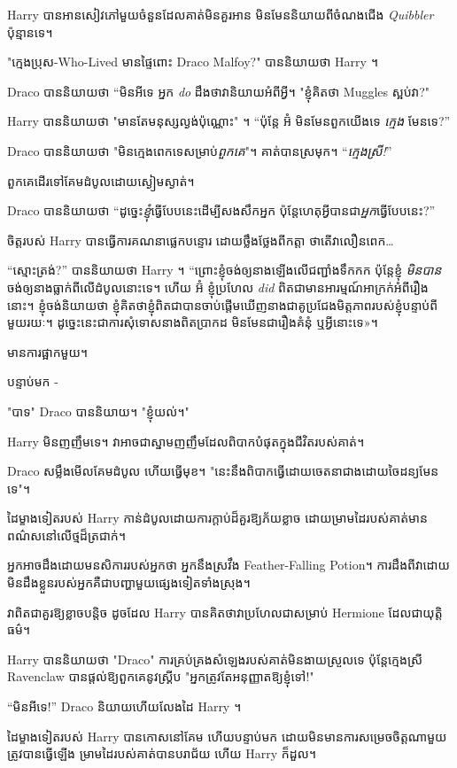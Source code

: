 Harry បានអានសៀវភៅមួយចំនួនដែលគាត់មិនគួរអាន មិនមែននិយាយពីចំណងជើង \emph{Quibbler} ប៉ុន្មានទេ។

"ក្មេងប្រុស-Who-Lived មានផ្ទៃពោះ Draco Malfoy?" បាននិយាយថា Harry ។

Draco បាននិយាយថា “មិនអីទេ អ្នក \emph{do} ដឹងថាវានិយាយអំពីអ្វី។ "ខ្ញុំគិតថា Muggles ស្អប់វា?"

Harry បាននិយាយថា "មានតែមនុស្សល្ងង់ប៉ុណ្ណោះ" ។ “ប៉ុន្តែ អ៊ំ មិនមែនពួកយើងទេ \emph{ក្មេង} មែនទេ?”

Draco បាននិយាយថា "មិនក្មេងពេកទេសម្រាប់\emph{ពួកគេ}"។ គាត់បានស្រមុក។ “\emph{ក្មេងស្រី!}”

ពួកគេដើរទៅគែមដំបូលដោយស្ងៀមស្ងាត់។

Draco បាននិយាយថា “ដូច្នេះ\emph{ខ្ញុំ}ធ្វើបែបនេះដើម្បីសងសឹកអ្នក ប៉ុន្តែហេតុអ្វីបានជា\emph{អ្នក}ធ្វើបែបនេះ?”

ចិត្តរបស់ Harry បានធ្វើការគណនាផ្លេកបន្ទោរ ដោយថ្លឹងថ្លែងពីកត្តា ថាតើវាលឿនពេក…

“ស្មោះត្រង់?” បាននិយាយថា Harry ។ “ព្រោះខ្ញុំចង់ឲ្យនាងឡើងលើជញ្ជាំងទឹកកក ប៉ុន្តែខ្ញុំ \emph{មិនបាន} ចង់ឲ្យនាងធ្លាក់ពីលើដំបូលនោះទេ។ ហើយ អ៊ំ ខ្ញុំប្រហែល \emph{did} ពិតជាមានអារម្មណ៍អាក្រក់អំពីរឿងនោះ។ ខ្ញុំចង់និយាយថា ខ្ញុំគិតថាខ្ញុំពិតជាបានចាប់ផ្តើមឃើញនាងជាគូប្រជែងមិត្តភាពរបស់ខ្ញុំបន្ទាប់ពីមួយរយៈ។ ដូច្នេះ​នេះ​ជា​ការ​សុំទោស​នាង​ពិត​ប្រាកដ មិន​មែន​ជា​រឿង​គំនុំ ឬ​អ្វី​នោះ​ទេ»។

មានការផ្អាកមួយ។

បន្ទាប់មក -

"បាទ" Draco បាននិយាយ។ "ខ្ញុំយល់។"

Harry មិនញញឹមទេ។ វាអាចជាស្នាមញញឹមដែលពិបាកបំផុតក្នុងជីវិតរបស់គាត់។

Draco សម្លឹងមើលគែមដំបូល ហើយធ្វើមុខ។ "នេះ​នឹង​ពិបាក​ធ្វើ​ដោយ​ចេតនា​ជាង​ដោយ​ចៃដន្យ​មែន​ទេ"។

\later

ដៃម្ខាងទៀតរបស់ Harry កាន់ដំបូលដោយការក្តាប់ដ៏គួរឱ្យភ័យខ្លាច ដោយម្រាមដៃរបស់គាត់មានពណ៌សនៅលើថ្មដ៏ត្រជាក់។

អ្នកអាចដឹងដោយមនសិការរបស់អ្នកថា អ្នកនឹងស្រវឹង Feather-Falling Potion។ ការដឹងពីវាដោយមិនដឹងខ្លួនរបស់អ្នកគឺជាបញ្ហាមួយផ្សេងទៀតទាំងស្រុង។

វាពិតជាគួរឱ្យខ្លាចបន្តិច ដូចដែល Harry បានគិតថាវាប្រហែលជាសម្រាប់ Hermione ដែលជាយុត្តិធម៌។

Harry បាននិយាយថា "Draco" ការគ្រប់គ្រងសំឡេងរបស់គាត់មិនងាយស្រួលទេ ប៉ុន្តែក្មេងស្រី Ravenclaw បានផ្តល់ឱ្យពួកគេនូវស្គ្រីប "អ្នកត្រូវតែអនុញ្ញាតឱ្យខ្ញុំទៅ!"

“មិនអីទេ!” Draco និយាយ​ហើយ​លែង​ដៃ Harry ។

ដៃម្ខាងទៀតរបស់ Harry បានកោសនៅគែម ហើយបន្ទាប់មក ដោយមិនមានការសម្រេចចិត្តណាមួយត្រូវបានធ្វើឡើង ម្រាមដៃរបស់គាត់បានបរាជ័យ ហើយ Harry ក៏ដួល។

